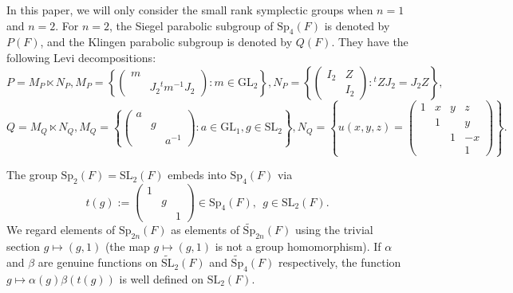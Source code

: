 \documentclass[11pt]{amsart}
\theoremstyle{definition}
\theoremstyle{remark}
\newcommand{\SL}{\mathrm{SL}}
\newcommand{\Sp}{\mathrm{Sp}}
\begin{document}
In this paper, we will only consider the small rank symplectic groups when $n=1$ and $n=2$.
For $n=2$, the Siegel parabolic subgroup of $\mathrm{Sp}_4(F)$ is denoted by $P(F)$, and the Klingen parabolic subgroup is denoted by $Q(F)$. They have the following Levi decompositions:
\begin{equation*}
P=M_P\ltimes N_P, M_P =\left\{ \left(\begin{smallmatrix} m & \\ & J_2 {}^t m^{-1} J_2\end{smallmatrix}\right):    m\in \mathrm{GL}_2 \right\} , N_P           =\left\{ \left(\begin{smallmatrix} I_2 &Z \\ & I_2\end{smallmatrix}\right):     {}^t Z  J_2 = J_2 Z \right\},
\end{equation*}
\begin{equation*}
Q=M_Q\ltimes N_Q, M_Q   =\left\{ \left(\begin{smallmatrix} a & & \\ & g &\\ &&a^{-1} \end{smallmatrix}\right):    a\in \mathrm{GL}_1, g\in \mathrm{SL}_2 \right\}, N_Q           =\left\{ u(x, y,z)=\left(\begin{smallmatrix} 1 & x & y & z\\ &1 & &y\\ &&1&-x\\&&&1 \end{smallmatrix} \right)\right\}  . 
\end{equation*}

The group $\mathrm{Sp}_2(F)=\mathrm{SL}_2(F)$ embeds into $\mathrm{Sp}_4(F)$ via
\begin{equation*}
t(g):=\left(  \begin{smallmatrix} 1 & &\\ &g &\\&&1 \end{smallmatrix}\right)\in \mathrm{Sp}_4(F), \ \ g\in \mathrm{SL}_2(F).
\end{equation*} 
We regard elements of $\Sp_{2n}(F)$ as elements of $\widetilde{\mathrm{Sp}}_{2n}(F)$ using the trivial section $g\mapsto (g, 1)$ (the map $g\mapsto (g, 1)$ is not a group homomorphism). If $\alpha$ and $\beta$ are genuine functions on $\widetilde{\mathrm{SL}}_{2}(F)$ and $\widetilde{\mathrm{Sp}}_{4}(F)$ respectively, the function $g\mapsto \alpha(g)\beta(t(g))$ is well defined on $\SL_{2}(F)$.
\end{document}
